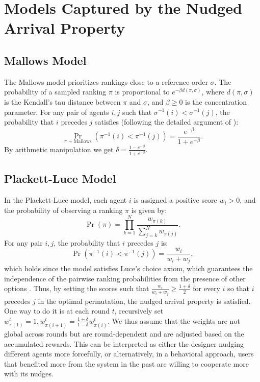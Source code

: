 \section{Models Captured by the Nudged Arrival Property}\label{appendix:nudge-models}
\subsection*{Mallows Model~\cite{mallows1957non}}

The Mallows model prioritizes rankings close to a reference order \( \sigma \). The probability of a sampled ranking \( \pi \) is proportional to \( e^{-\beta d(\pi, \sigma)} \), where \( d(\pi, \sigma) \) is the Kendall's tau distance between \( \pi \) and \( \sigma \), and \( \beta \geq 0 \) is the concentration parameter. For any pair of agents \( i, j \) such that \( \sigma^{-1}(i) < \sigma^{-1}(j) \), the probability that \( i \) precedes \( j \) satisfies (following the detailed argument of \cite[Section 2]{lu2014effective}):
\[
\Pr_{\pi \sim \text{Mallows}}(\pi^{-1}(i) < \pi^{-1}(j)) = \frac{e^{-\beta}}{1 + e^{-\beta}}.
\]
By arithmetic manipulation we get $\delta = \frac{1 - e^{-\beta}}{1 + e^{-\beta}}$. 


\subsection*{Plackett-Luce Model~\cite{marden1996analyzing}}
In the Plackett-Luce model, each agent \( i \) is assigned a positive score \( w_i > 0 \), and the probability of observing a ranking \( \pi \) is given by:
\[
\Pr(\pi) = \prod_{k=1}^{N} \frac{w_{\pi(k)}}{\sum_{j=k}^{N} w_{\pi(j)}}.
\]
For any pair \( i, j \), the probability that \( i \) precedes \( j \) is:
\[
\Pr(\pi^{-1}(i) < \pi^{-1}(j)) = \frac{w_i}{w_i + w_j},
\]
which holds since the model satisfies Luce's choice axiom, which guarantees the independence of the pairwise ranking probabilities from the presence of other options \cite{luce1959individual}. Thus, by setting the scores such that \( \frac{w_i}{w_i + w_j} \geq \frac{1+\delta}{2} \) for every $i$ so that $i$ precedes $j$ in the optimal permutation, the nudged arrival property is satisfied. One way to do it is at each round $t$, recursively set $w_{\pi(1)}^{t} = 1, w_{\pi(i+1)}^{t} = \frac{1+\delta}{1 - \delta} w_{\pi(i)}^{t}$. We thus assume that the weights are not global across rounds but are round-dependent and are adjusted based on the accumulated rewards. This can be interpreted as either the designer nudging different agents more forcefully, or alternatively, in a behavioral approach, users that benefited more from the system in the past are willing to cooperate more with its nudges. 


